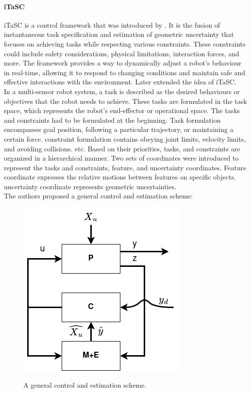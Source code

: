 \documentclass[report.tex]{subfiles}
\begin{document}
    \paragraph*{\large{iTaSC}\\}
    iTaSC is a control framework that was introduced by \cite{smits2008itasc}. It is the fusion of instantaneous task specification and estimation of geometric uncertainty that focuses on achieving tasks while respecting various constraints. These constraints could include safety considerations, physical limitations, interaction forces, and more. The framework provides a way to dynamically adjust a robot's behaviour in real-time, allowing it to respond to changing conditions and maintain safe and effective interactions with the environment. Later \cite{decre2009extending} extended the idea of iTaSC.\\
    In a multi-sensor robot system, a task is described as the desired behaviours or objectives that the robot needs to achieve. These tasks are formulated in the task space, which represents the robot's end-effector or operational space. The tasks and constraints had to be formulated at the beginning. Task formulation encompasses goal position, following a particular trajectory, or maintaining a certain force. constraint formulation contains obeying joint limits, velocity limits, and avoiding collisions. etc. Based on their priorities, tasks, and constraints are organized in a hierarchical manner. Two sets of coordinates were introduced to represent the tasks and constraints, feature, and uncertainty coordinates. Feature coordinate expresses the relative motions between features on specific objects. uncertainty coordinate represents geometric uncertainties.\\
    The authors proposed a general control and estimation scheme:
    \begin{figure}[h!]
        \centering
        \includegraphics[width=0.4\linewidth]{images/iTaSC.png}
        \caption{A general control and estimation scheme.}\cite{smits2008itasc}
        \label{fig:itasc}
    \end{figure}
\end{document}
